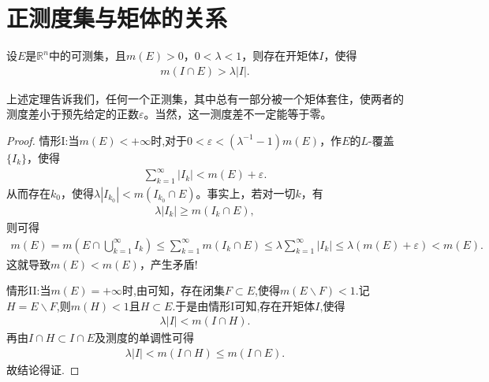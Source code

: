 \documentclass[../../main.tex]{subfiles}%
\begin{document}
\section{正测度集与矩体的关系}

\begin{theorem}\label{theorem:定理2.19}
设\(E\)是\(\mathbb{R}^n\)中的可测集，且\(m(E)>0\)，\(0 < \lambda < 1\)，则存在开矩体\(I\)，使得
\begin{align}
m(I\cap E)>\lambda|I|.\label{eq::::--FSAFF-2.8}
\end{align}
\end{theorem}
\begin{remark}
上述定理告诉我们，任何一个正测集，其中总有一部分被一个矩体套住，使两者的测度差小于预先给定的正数\(\varepsilon\)。当然，这一测度差不一定能等于零。 
\end{remark}
\begin{proof}

{\heiti 情形I:}当\(m(E)<+\infty\)时,对于\(0 < \varepsilon < (\lambda^{-1}-1)m(E)\)，作\(E\)的\(L\)-覆盖\(\{I_k\}\)，使得
\begin{align*}
\sum_{k = 1}^{\infty}|I_k|<m(E)+\varepsilon.
\end{align*}
从而存在\(k_0\)，使得\(\lambda|I_{k_0}|<m(I_{k_0}\cap E)\)。事实上，若对一切\(k\)，有
\begin{align*}
\lambda|I_k|\geqslant m(I_k\cap E),
\end{align*}
则可得
\begin{align*}
m(E)=m(E\cap \bigcup_{k=1}^{\infty}I_k)\leqslant\sum_{k = 1}^{\infty}m(I_k\cap E)\leqslant\lambda\sum_{k = 1}^{\infty}|I_k|\leqslant\lambda(m(E)+\varepsilon)<m(E).
\end{align*}
这就导致\(m(E)<m(E)\)，产生矛盾!

{\heiti 情形II:}当$m(E)=+\infty$时,由可知，存在闭集$F\subset E$,使得$m(E\backslash F)<1$.记$H=E\backslash F$,则$m(H)<1$且$H\subset E$.于是由{\heiti 情形I}可知,存在开矩体$I$,使得
\begin{align*}
\lambda |I|<m(I\cap H).
\end{align*}
再由$I\cap H\subset I\cap E$及测度的单调性可得
\begin{align*}
\lambda |I|<m(I\cap H)\leqslant m(I\cap E).
\end{align*}
故结论得证.
\end{proof}
\end{document}
